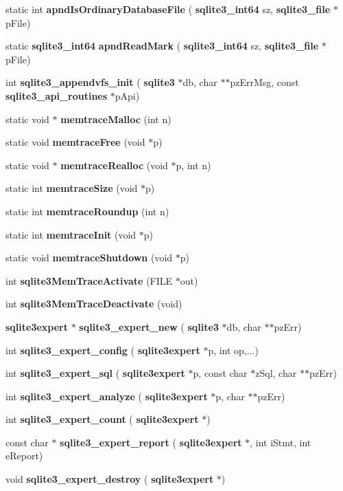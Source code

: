 \begin{DoxyCompactItemize}
\item 
static int \textbf{ apnd\+Is\+Ordinary\+Database\+File} (\textbf{ sqlite3\+\_\+int64} sz, \textbf{ sqlite3\+\_\+file} $\ast$p\+File)
\item 
static \textbf{ sqlite3\+\_\+int64} \textbf{ apnd\+Read\+Mark} (\textbf{ sqlite3\+\_\+int64} sz, \textbf{ sqlite3\+\_\+file} $\ast$p\+File)
\item 
int \textbf{ sqlite3\+\_\+appendvfs\+\_\+init} (\textbf{ sqlite3} $\ast$db, char $\ast$$\ast$pz\+Err\+Msg, const \textbf{ sqlite3\+\_\+api\+\_\+routines} $\ast$p\+Api)
\item 
static void $\ast$ \textbf{ memtrace\+Malloc} (int n)
\item 
static void \textbf{ memtrace\+Free} (void $\ast$p)
\item 
static void $\ast$ \textbf{ memtrace\+Realloc} (void $\ast$p, int n)
\item 
static int \textbf{ memtrace\+Size} (void $\ast$p)
\item 
static int \textbf{ memtrace\+Roundup} (int n)
\item 
static int \textbf{ memtrace\+Init} (void $\ast$p)
\item 
static void \textbf{ memtrace\+Shutdown} (void $\ast$p)
\item 
int \textbf{ sqlite3\+Mem\+Trace\+Activate} (F\+I\+LE $\ast$out)
\item 
int \textbf{ sqlite3\+Mem\+Trace\+Deactivate} (void)
\item 
\textbf{ sqlite3expert} $\ast$ \textbf{ sqlite3\+\_\+expert\+\_\+new} (\textbf{ sqlite3} $\ast$db, char $\ast$$\ast$pz\+Err)
\item 
int \textbf{ sqlite3\+\_\+expert\+\_\+config} (\textbf{ sqlite3expert} $\ast$p, int op,...)
\item 
int \textbf{ sqlite3\+\_\+expert\+\_\+sql} (\textbf{ sqlite3expert} $\ast$p, const char $\ast$z\+Sql, char $\ast$$\ast$pz\+Err)
\item 
int \textbf{ sqlite3\+\_\+expert\+\_\+analyze} (\textbf{ sqlite3expert} $\ast$p, char $\ast$$\ast$pz\+Err)
\item 
int \textbf{ sqlite3\+\_\+expert\+\_\+count} (\textbf{ sqlite3expert} $\ast$)
\item 
const char $\ast$ \textbf{ sqlite3\+\_\+expert\+\_\+report} (\textbf{ sqlite3expert} $\ast$, int i\+Stmt, int e\+Report)
\item 
void \textbf{ sqlite3\+\_\+expert\+\_\+destroy} (\textbf{ sqlite3expert} $\ast$)
\item 

\end{DoxyCompactItemize}

